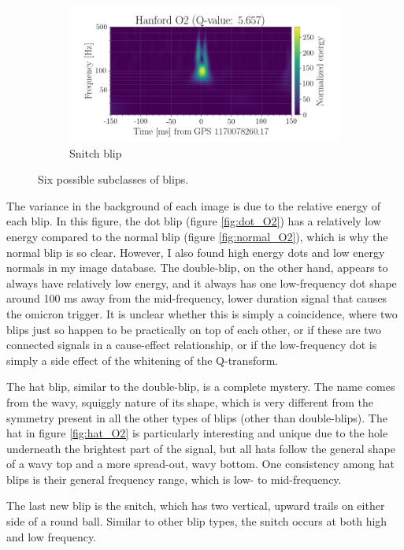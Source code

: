 \documentclass[a4paper]{article}
\begin{document}
\begin{figure}[h!]
\begin{subfigure}{.49\textwidth}
		\centering
		\includegraphics[width=1\linewidth]{snitch_O2}
		\caption{Snitch blip}
		\label{fig:snitch_O2}
	\end{subfigure}
	\caption{Six possible subclasses of blips.}
	\label{fig:six}
\end{figure}

The variance in the background of each image is due to the relative energy of each blip. In this figure, the dot blip (figure \ref{fig:dot_O2}) has a relatively low energy compared to the normal blip (figure \ref{fig:normal_O2}), which is why the normal blip is so clear. However, I also found high energy dots and low energy normals in my image database. The double-blip, on the other hand, appears to always have relatively low energy, and it always has one low-frequency dot shape around 100 ms away from the mid-frequency, lower duration signal that causes the omicron trigger. It is unclear whether this is simply a coincidence, where two blips just so happen to be practically on top of each other, or if these are two connected signals in a cause-effect relationship, or if the low-frequency dot is simply a side effect of the whitening of the Q-transform.

The hat blip, similar to the double-blip, is a complete mystery. The name comes from the wavy, squiggly nature of its shape, which is very different from the symmetry present in all the other types of blips (other than double-blips). The hat in figure \ref{fig:hat_O2} is particularly interesting and unique due to the hole underneath the brightest part of the signal, but all hats follow the general shape of a wavy top and a more spread-out, wavy bottom. One consistency among hat blips is their general frequency range, which is low- to mid-frequency.

The last new blip is the snitch, which has two vertical, upward trails on either side of a round ball. Similar to other blip types, the snitch occurs at both high and low frequency. 
\end{document}
